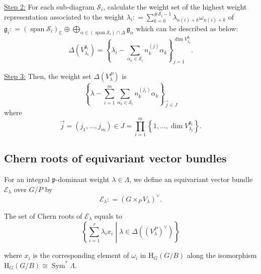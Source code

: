 \documentclass[uplatex,dvipdfmx]{jsarticle}
\newcommand{\defeq}{\mathrel{\mathop:}=}
\DeclareMathOperator{\Sym}{Sym}
\begin{document}
\underline{Step 2:}
For each sub-diagram 
$\mathcal{S}_i$, 
calculate the weight set of the highest weight representation
associated to the weight
$\lambda_i 
\defeq
\sum_{k = 0}^{\# \mathcal{S}_i - 1}
\lambda_{n(i) + k} \omega_{n(i) + k}$
of 
$\mathfrak{g}_i
\defeq
(\operatorname{span} \mathcal{S}_i)_\mathbb{C} 
\oplus 
\bigoplus_{\alpha \in (\operatorname{span} \mathcal{S}_i)\cap \Delta}
\mathfrak{g}_\alpha$ which can be described as below:
\begin{equation}
    \Delta\left( 
        V
        ^{\mathfrak{g}_i}
        _{\lambda_i}
    \right)
    =
    \left\{ 
        \lambda_i - \sum_{\alpha_k \in \mathcal{S}_i} n_k^{(j)} \alpha_k
    \right\}
    _{j = 1}
    ^{\operatorname{dim}
        V
        ^{\mathfrak{g}_i}
        _{\lambda_i}}.
\end{equation}

\underline{Step 3:}
Then, the weight set 
$\Delta(V_\lambda^P)$
is
\begin{equation}
    \left\{ 
        \lambda 
        - 
        \sum_{i = 1}^m
        \sum_{\alpha_k \in \mathcal{S}_i} 
        n_k^{(j_i)} \alpha_k
    \right\}_{\vec{j} \in J}
\end{equation}
where
\begin{equation}
    \vec{j}
    =
    \left( j_1, \ldots, j_m \right)
    \in
    J
    =
    \prod_{i = 1}^m
    \left\{ 1, \ldots, \operatorname{dim} V^{\mathfrak{g}_i}_{\lambda_i} \right\}.
\end{equation}

\subsection{Chern roots of equivariant vector bundles}

For an integral
$\mathfrak{p}$-dominant
weight
$\lambda \in \Lambda$,
we define an equivariant vector bundle 
$\mathcal{E}_\lambda$
over
$G/P$
by
\begin{equation}
    \mathcal{E}_\lambda
    \defeq
    \left( 
        G
        \times_P
        V_\lambda
     \right)^{\vee}.
\end{equation}

The set of Chern roots of
$\mathcal{E}_\lambda$
equals to
\begin{equation}
    \left\{ 
        \sum_{i = 1}^r
        \lambda_i
        x_i
        \middle|
        \lambda \in \Delta((V_\lambda^P)^{\vee})
    \right\}
\end{equation}

where
$x_i$
is the corresponding element of
$\omega_i$
in
$\mathrm{H}_G(G/B)$
along the isomorphism
$\mathrm{H}_G(G/B) \cong \Sym^* \Lambda$.
\end{document}
